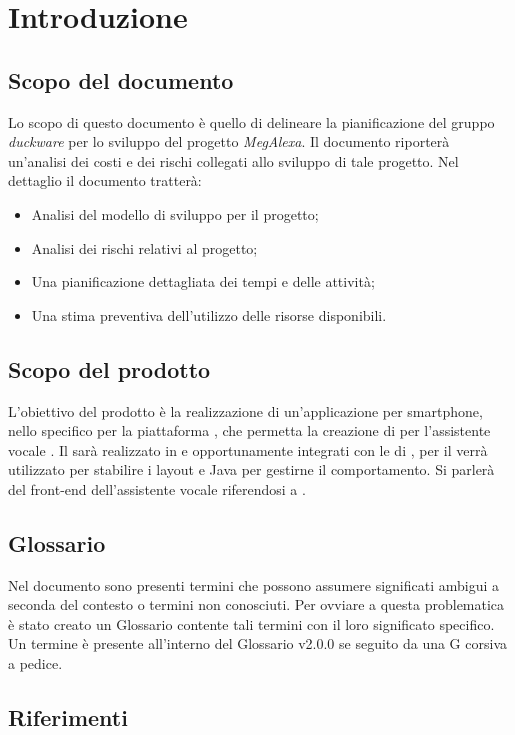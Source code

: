 \clearpage
\section{Introduzione}
\label{sec:intro}
\subsection{Scopo del documento}
Lo scopo di questo documento è quello di delineare la pianificazione del gruppo \emph{duckware} per lo sviluppo del progetto \emph{MegAlexa}. Il documento riporterà un'analisi dei costi e dei rischi collegati allo sviluppo di tale progetto. Nel dettaglio il documento tratterà:
\begin{itemize}
	\item Analisi del modello di sviluppo per il progetto;
	\item Analisi dei rischi relativi al progetto;
	\item Una pianificazione dettagliata dei tempi e delle attività;
	\item Una stima preventiva dell'utilizzo delle risorse disponibili.
\end{itemize}
\subsection{Scopo del prodotto}
L'obiettivo del prodotto è la realizzazione di un'applicazione per smartphone, nello specifico per la piattaforma , che permetta la creazione di  per l'assistente vocale  . Il  sarà realizzato in  e  opportunamente integrati con le  di , per il  verrà utilizzato  per stabilire i layout e Java per gestirne il comportamento. Si parlerà del front-end dell'assistente vocale riferendosi a .
\subsection{Glossario}
Nel documento sono presenti termini che possono assumere significati ambigui a seconda del contesto o termini non conosciuti. Per ovviare a questa problematica è stato creato un Glossario contente tali termini con il loro significato specifico. Un termine è presente all'interno del Glossario v2.0.0 se seguito da una G corsiva a pedice.
\subsection{Riferimenti}
